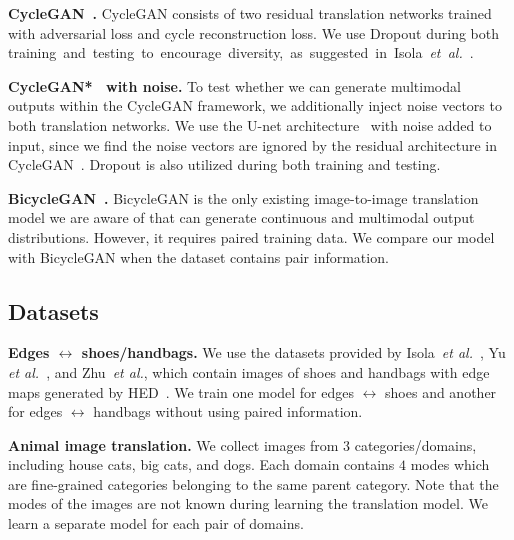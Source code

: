 \documentclass[runningheads]{llncs}
\newcommand{\vpara}[1]{\vspace{0.05in}\noindent\textbf{#1}}
\def\etal{\emph{et al.}\xspace}
\begin{document}
\vpara{CycleGAN~\cite{zhu2017unpaired}.} CycleGAN consists of two residual translation networks trained with adversarial loss and cycle reconstruction loss. We use Dropout during both \mbox{training and testing to encourage diversity, as suggested in Isola \etal~\cite{isola2017image}.}
	
	\vpara{CycleGAN*~\cite{zhu2017unpaired} with noise.} To test whether we can generate multimodal outputs within the CycleGAN framework, we additionally inject noise vectors to both translation networks. We use the U-net architecture~\cite{zhu2017toward} with noise added to input, since we find the noise vectors are ignored by the residual architecture in CycleGAN~\cite{zhu2017unpaired}. Dropout is also utilized during both training and testing.
	


	\vpara{BicycleGAN~\cite{zhu2017toward}.} BicycleGAN is the only existing image-to-image translation model we are aware of that can generate continuous and multimodal output distributions. However, it requires paired training data. We compare our model with BicycleGAN when the dataset contains pair information. 






	\subsection{Datasets}


\vpara{Edges $\leftrightarrow$ shoes/handbags.} We use the datasets provided by Isola~\etal~\cite{isola2017image}, Yu \etal~\cite{yu2014fine}, and Zhu~\etal\cite{zhu2016generative}, which contain images of shoes and handbags with edge maps generated by HED~\cite{xie2015holistically}. We train one model for edges $\leftrightarrow$ shoes and another for edges $\leftrightarrow$ handbags without using paired information.
	
	\vpara{Animal image translation.} We collect images from $3$ categories/domains, including house cats, big cats, and dogs. Each domain contains $4$ modes which are fine-grained categories belonging to the same parent category. Note that the modes of the images are not known during learning the translation model. 
We learn a separate model for each pair of domains. 
	
\end{document}
